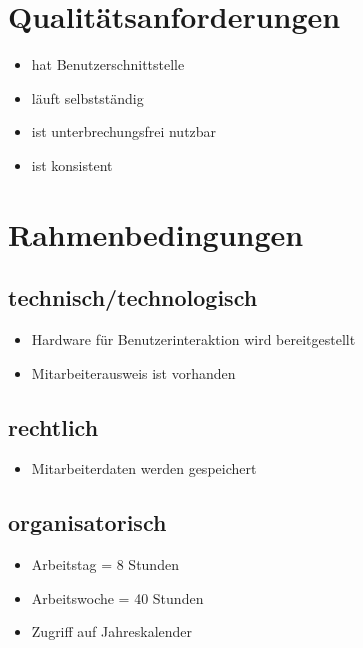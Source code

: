 \section{Qualitätsanforderungen}

\begin{itemize}
\item hat Benutzerschnittstelle
\item läuft selbstständig
\item ist unterbrechungsfrei nutzbar %
\item ist konsistent
\end{itemize}

\section{Rahmenbedingungen}
\subsection{technisch/technologisch}
\begin{itemize}
\item Hardware für Benutzerinteraktion wird bereitgestellt
\item Mitarbeiterausweis ist vorhanden
\end{itemize}
\subsection{rechtlich}
\begin{itemize}
\item Mitarbeiterdaten werden gespeichert
\end{itemize}
\subsection{organisatorisch}
\begin{itemize}
\item Arbeitstag = 8 Stunden
\item Arbeitswoche = 40 Stunden
\item Zugriff auf Jahreskalender
\end{itemize}


 
